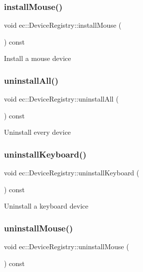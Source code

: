 \subsubsection{\texorpdfstring{install\+Mouse()}{installMouse()}}
{\footnotesize\ttfamily void ec\+::\+Device\+Registry\+::install\+Mouse (\begin{DoxyParamCaption}{ }\end{DoxyParamCaption}) const}

Install a mouse device \mbox{\label{classec_1_1_device_registry_ab5dc2383c4d5c6f8458f8be914dc7982}} 
\subsubsection{\texorpdfstring{uninstall\+All()}{uninstallAll()}}
{\footnotesize\ttfamily void ec\+::\+Device\+Registry\+::uninstall\+All (\begin{DoxyParamCaption}{ }\end{DoxyParamCaption}) const}

Uninstall every device \mbox{\label{classec_1_1_device_registry_a1ff6b28edf3073f0a483a04bd0b3458d}} 
\subsubsection{\texorpdfstring{uninstall\+Keyboard()}{uninstallKeyboard()}}
{\footnotesize\ttfamily void ec\+::\+Device\+Registry\+::uninstall\+Keyboard (\begin{DoxyParamCaption}{ }\end{DoxyParamCaption}) const}

Uninstall a keyboard device \mbox{\label{classec_1_1_device_registry_a18bc5f140735a3f9abd453b89f472f2a}} 
\subsubsection{\texorpdfstring{uninstall\+Mouse()}{uninstallMouse()}}
{\footnotesize\ttfamily void ec\+::\+Device\+Registry\+::uninstall\+Mouse (\begin{DoxyParamCaption}{ }\end{DoxyParamCaption}) const}

